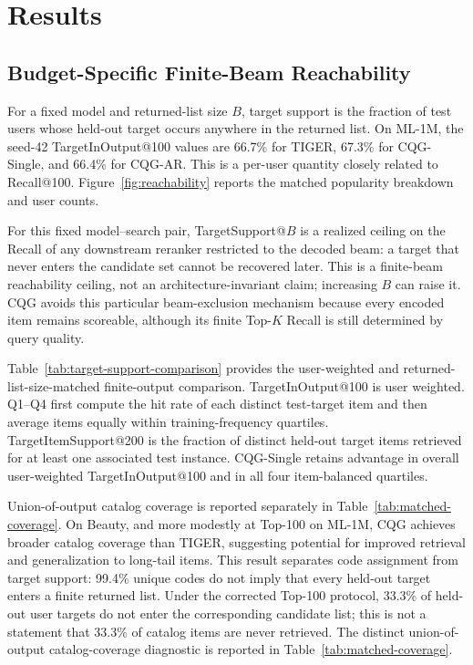 \documentclass[preprint,12pt]{elsarticle}
\begin{document}
\section{Results}

\subsection{Budget-Specific Finite-Beam Reachability}

For a fixed model and returned-list size $B$, target support is the fraction of test
users whose held-out target occurs anywhere in the returned list. On ML-1M,
the seed-42 TargetInOutput@100 values are 66.7\% for TIGER, 67.3\% for
CQG-Single, and 66.4\% for CQG-AR. This is a per-user quantity closely related
to Recall@100.
Figure~\ref{fig:reachability} reports the matched popularity breakdown and
user counts.

For this fixed model--search pair, TargetSupport@$B$ is a realized ceiling on
the Recall of any downstream reranker restricted to the decoded beam: a target
that never enters the candidate set cannot be recovered later. This is a
finite-beam reachability ceiling, not an architecture-invariant claim; increasing
$B$ can raise it. CQG avoids this particular beam-exclusion mechanism because
every encoded item remains scoreable, although its finite Top-$K$ Recall is
still determined by query quality.

Table~\ref{tab:target-support-comparison} provides the user-weighted and returned-list-size-matched finite-output comparison. TargetInOutput@100 is user weighted. Q1--Q4 first compute the hit rate of each distinct test-target item and then average items equally within training-frequency quartiles. TargetItemSupport@200 is the fraction of distinct held-out target items retrieved for at least one associated test instance. 
CQG-Single retains advantage in overall user-weighted TargetInOutput@100 and in all four item-balanced quartiles.

Union-of-output catalog coverage is reported separately in Table~\ref{tab:matched-coverage}. On Beauty, and more modestly at Top-100 on ML-1M, CQG achieves broader
catalog coverage than TIGER, suggesting potential for improved retrieval
and generalization to long-tail items.
This result separates code assignment from target support: 99.4\% unique codes do not imply that every held-out target enters a finite returned list. Under the corrected Top-100 protocol, 33.3\% of held-out user targets do not enter the corresponding candidate list; this is not a statement that 33.3\% of catalog items are never retrieved. The distinct union-of-output catalog-coverage diagnostic is reported in Table~\ref{tab:matched-coverage}.
\end{document}
